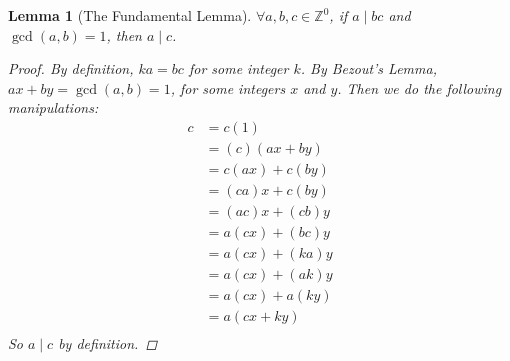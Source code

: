 \documentclass{article}
\newcommand{\ZZ}{\mathbb{Z}}
\newtheorem{lem}{Lemma}
\begin{document}
  \begin{lem} [The Fundamental Lemma] $\forall a, b, c \in \ZZ^0$, if $a \mid bc$ and $\gcd(a, b) = 1$, then $a \mid c$.
    \begin{proof}
      By definition, $ka = bc$ for some integer $k$. By Bezout's Lemma, $ax + by = \gcd(a,b) = 1$, for some integers $x$ and $y$. Then we do the following manipulations:
      \begin{align*}
        c &= c(1)\\
          &= (c)(ax + by) \\
          &= c(ax) + c(by) \\
          &= (ca)x + c(by) \\
          &= (ac)x + (cb)y \\
          &= a(cx) + (bc)y \\
          &= a(cx) + (ka)y \\
          &= a(cx) + (ak)y \\
          &= a(cx) + a(ky) \\
          &= a(cx + ky) \\
      \end{align*}
      So $a \mid c$ by definition.
    \end{proof}
  \end{lem}
\end{document}

